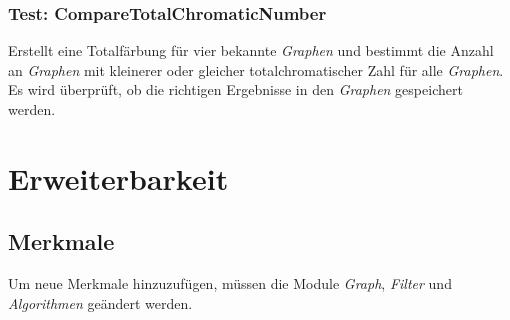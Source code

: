 \documentclass[13pt]{scrreprt}
\begin{document}
\subsection{Test: CompareTotalChromaticNumber}
Erstellt eine Totalfärbung für vier bekannte \textit{Graphen} und bestimmt die Anzahl an \textit{Graphen} mit kleinerer oder gleicher totalchromatischer Zahl für alle \textit{Graphen}. Es wird überprüft, ob die richtigen Ergebnisse in den \textit{Graphen} gespeichert werden.
\chapter{Erweiterbarkeit}

\section{Merkmale}
Um neue Merkmale hinzuzufügen, müssen die Module \textit{Graph}, \textit{Filter} und \textit{Algorithmen} geändert werden.
\end{document}
